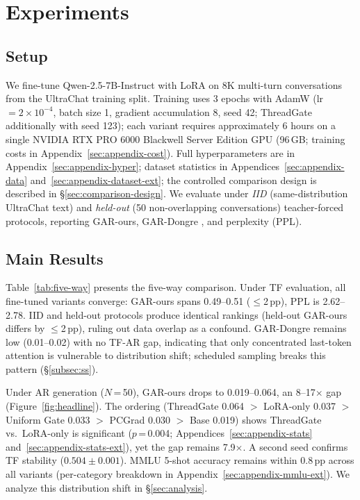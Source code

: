 \section{Experiments}
\label{sec:experiments}

\subsection{Setup}

We fine-tune Qwen-2.5-7B-Instruct with LoRA \citep{hu2022lora,dettmers2023qlora} on 8K multi-turn conversations from the UltraChat \citep{ding2023ultrachat} training split. Training uses 3 epochs with AdamW (lr $= 2 \times 10^{-4}$, batch size 1, gradient accumulation 8, seed 42; ThreadGate additionally with seed 123); each variant requires approximately 6 hours on a single NVIDIA RTX PRO 6000 Blackwell Server Edition GPU (96\,GB; training costs in Appendix~\ref{sec:appendix-cost}). Full hyperparameters are in Appendix~\ref{sec:appendix-hyper}; dataset statistics in Appendices~\ref{sec:appendix-data} and~\ref{sec:appendix-dataset-ext}; the controlled comparison design is described in \S\ref{sec:comparison-design}. We evaluate under \emph{IID} (same-distribution UltraChat text) and \emph{held-out} (50 non-overlapping conversations) teacher-forced protocols, reporting GAR-ours, GAR-Dongre \citep{dongre2026attention}, and perplexity (PPL).

\subsection{Main Results}

Table~\ref{tab:five-way} presents the five-way comparison. Under TF evaluation, all fine-tuned variants converge: GAR-ours spans 0.49--0.51 ($\leq$2\,pp), PPL is 2.62--2.78. IID and held-out protocols produce identical rankings (held-out GAR-ours differs by $\leq$2\,pp), ruling out data overlap as a confound. GAR-Dongre remains low (0.01--0.02) with no TF-AR gap, indicating that only concentrated last-token attention is vulnerable to distribution shift; scheduled sampling breaks this pattern (\S\ref{subsec:ss}).

Under AR generation ($N$\,=\,50), GAR-ours drops to 0.019--0.064, an 8--17$\times$ gap (Figure~\ref{fig:headline}). The ordering (ThreadGate 0.064 $>$ LoRA-only 0.037 $>$ Uniform Gate 0.033 $>$ PCGrad 0.030 $>$ Base 0.019) shows ThreadGate vs.\ LoRA-only is significant ($p$\,=\,0.004; Appendices~\ref{sec:appendix-stats} and~\ref{sec:appendix-stats-ext}), yet the gap remains 7.9$\times$. A second seed confirms TF stability ($0.504\pm0.001$). MMLU 5-shot accuracy remains within 0.8\,pp across all variants (per-category breakdown in Appendix~\ref{sec:appendix-mmlu-ext}). We analyze this distribution shift in \S\ref{sec:analysis}.

